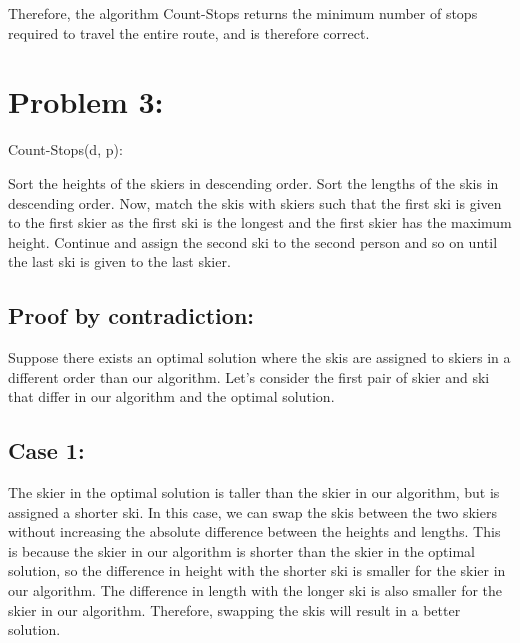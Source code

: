 \documentclass[fleqn,10pt]{olplainarticle}
\begin{document}
Therefore, the algorithm Count-Stops returns the minimum number of stops required to travel the entire route, and is therefore correct.

\section*{Problem 3:}

\begin{algorithm}
    \caption{Count-Stops(d, p):}
    \begin{algorithmic}[1]
    \State Sort the heights of the skiers in descending order.
    \State Sort the lengths of the skis in descending order.
    \State Now, match the skis with skiers such that the first ski is given to the first skier as the first ski is the longest and the first skier has the maximum height.
    \State Continue and assign the second ski to the second person and so on until the last ski is given to the last skier.
    \end{algorithmic}
\end{algorithm}

\subsection*{Proof by contradiction:\newline }
 Suppose there exists an optimal solution where the skis are assigned to skiers in a different order than our algorithm. Let's consider the first pair of skier and ski that differ in our algorithm and the optimal solution.
 \subsection*{Case 1:}
The skier in the optimal solution is taller than the skier in our algorithm, but is assigned a shorter ski.
In this case, we can swap the skis between the two skiers without increasing the absolute difference between the heights and lengths. This is because the skier in our algorithm is shorter than the skier in the optimal solution, so the difference in height with the shorter ski is smaller for the skier in our algorithm. The difference in length with the longer ski is also smaller for the skier in our algorithm. Therefore, swapping the skis will result in a better solution.
\end{document}
